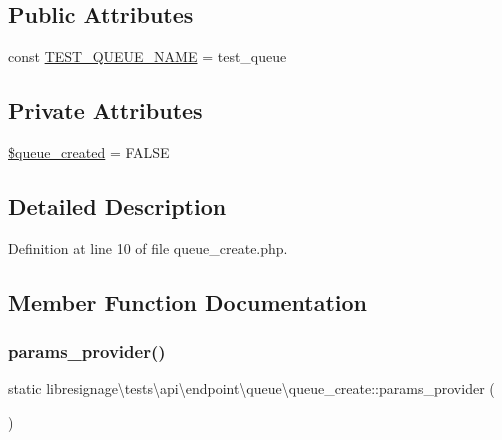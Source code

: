 \subsection*{Public Attributes}
\begin{DoxyCompactItemize}
\item 
const \hyperlink{classlibresignage_1_1tests_1_1api_1_1endpoint_1_1queue_1_1queue__create_ab435485fa77014cc9a6bb4caddbe3dc4}{T\+E\+S\+T\+\_\+\+Q\+U\+E\+U\+E\+\_\+\+N\+A\+ME} = \textquotesingle{}test\+\_\+queue\textquotesingle{}
\end{DoxyCompactItemize}
\subsection*{Private Attributes}
\begin{DoxyCompactItemize}
\item 
\hyperlink{classlibresignage_1_1tests_1_1api_1_1endpoint_1_1queue_1_1queue__create_a78db66a1beb34da0203953006e90743a}{\$queue\+\_\+created} = F\+A\+L\+SE
\end{DoxyCompactItemize}


\subsection{Detailed Description}


Definition at line 10 of file queue\+\_\+create.\+php.



\subsection{Member Function Documentation}
\mbox{\label{classlibresignage_1_1tests_1_1api_1_1endpoint_1_1queue_1_1queue__create_aa59a40a8706cad50c11c5775fdca6626}} 
\subsubsection{\texorpdfstring{params\+\_\+provider()}{params\_provider()}}
{\footnotesize\ttfamily static libresignage\textbackslash{}tests\textbackslash{}api\textbackslash{}endpoint\textbackslash{}queue\textbackslash{}queue\+\_\+create\+::params\+\_\+provider (\begin{DoxyParamCaption}{ }\end{DoxyParamCaption})\hspace{0.3cm}{\ttfamily [static]}}



